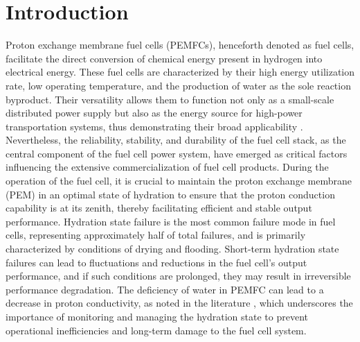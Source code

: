\section{Introduction}
Proton exchange membrane fuel cells (PEMFCs), henceforth denoted as fuel cells, facilitate the direct conversion of chemical energy present in hydrogen into electrical energy.
These fuel cells are characterized by their high energy utilization rate, low operating temperature, and the production of water as the sole reaction byproduct.
Their versatility allows them to function not only as a small-scale distributed power supply but also as the energy source for high-power transportation systems, thus demonstrating their broad applicability \cite{sharafOverviewFuelCell2014} .
Nevertheless, the reliability, stability, and durability of the fuel cell stack, as the central component of the fuel cell power system, have emerged as critical factors influencing the extensive commercialization of fuel cell products.
During the operation of the fuel cell, it is crucial to maintain the proton exchange membrane (PEM) in an optimal state of hydration to ensure that the proton conduction capability is at its zenith, thereby facilitating efficient and stable output performance.
Hydration state failure is the most common failure mode in fuel cells, representing approximately half of total failures, and is primarily characterized by conditions of drying and flooding.
Short-term hydration state failures can lead to fluctuations and reductions in the fuel cell's output performance, and if such conditions are prolonged, they may result in irreversible performance degradation.
The deficiency of water in PEMFC can lead to a decrease in proton conductivity, as noted in the literature \cite{shen_partial_2020,ous_degradation_2013,xiao_influence_2023}, which underscores the importance of monitoring and managing the hydration state to prevent operational inefficiencies and long-term damage to the fuel cell system.
